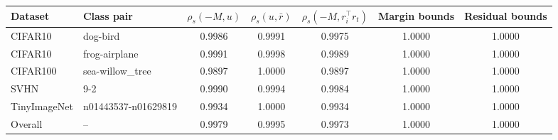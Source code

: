 \begin{tabular}{llccccc}
\toprule
Dataset & Class pair & $\rho_s(-M,u)$ & $\rho_s(u,\bar r)$ & $\rho_s(-M,r_i^\top r_t)$ & Margin bounds & Residual bounds \\
\midrule
CIFAR10 & dog-bird & 0.9986 & 0.9991 & 0.9975 & 1.0000 & 1.0000 \\
CIFAR10 & frog-airplane & 0.9991 & 0.9998 & 0.9989 & 1.0000 & 1.0000 \\
CIFAR100 & sea-willow\_tree & 0.9897 & 1.0000 & 0.9897 & 1.0000 & 1.0000 \\
SVHN & 9-2 & 0.9990 & 0.9994 & 0.9984 & 1.0000 & 1.0000 \\
TinyImageNet & n01443537-n01629819 & 0.9934 & 1.0000 & 0.9934 & 1.0000 & 1.0000 \\
Overall & -- & 0.9979 & 0.9995 & 0.9973 & 1.0000 & 1.0000 \\
\bottomrule
\end{tabular}

